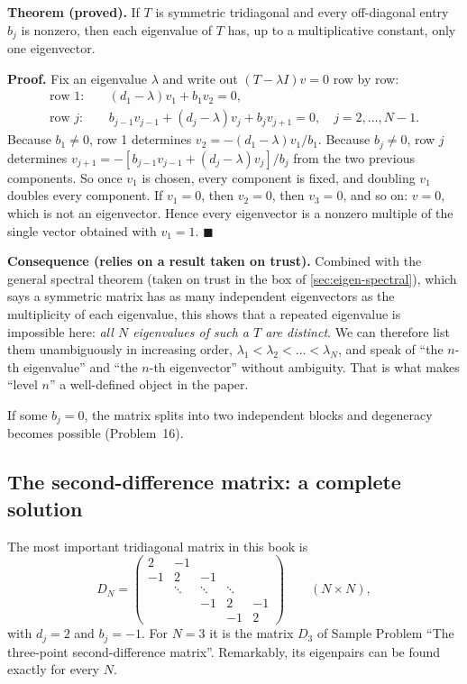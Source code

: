 \textbf{Theorem (proved).} If $T$ is symmetric tridiagonal and every off-diagonal entry $b_j$ is nonzero, then each eigenvalue of $T$ has, up to a multiplicative constant, only one eigenvector.

\textbf{Proof.} Fix an eigenvalue $\lambda$ and write out $(T-\lambda I)v=0$ row by row:
\begin{align}
\text{row }1:&\quad (d_1-\lambda)v_1+b_1v_2=0,\\
\text{row }j:&\quad b_{j-1}v_{j-1}+(d_j-\lambda)v_j+b_jv_{j+1}=0,\quad j=2,\dots,N-1.
\end{align}
Because $b_1\ne0$, row 1 determines $v_2=-(d_1-\lambda)v_1/b_1$. Because $b_j\ne0$, row $j$ determines $v_{j+1}=-[b_{j-1}v_{j-1}+(d_j-\lambda)v_j]/b_j$ from the two previous components. So once $v_1$ is chosen, every component is fixed, and doubling $v_1$ doubles every component. If $v_1=0$, then $v_2=0$, then $v_3=0$, and so on: $v=0$, which is not an eigenvector. Hence every eigenvector is a nonzero multiple of the single vector obtained with $v_1=1$. $\blacksquare$

\textbf{Consequence (relies on a result taken on trust).} Combined with the general spectral theorem (taken on trust in the box of \cref{sec:eigen-spectral}), which says a symmetric matrix has as many independent eigenvectors as the multiplicity of each eigenvalue, this shows that a repeated eigenvalue is impossible here: \emph{all $N$ eigenvalues of such a $T$ are distinct}. We can therefore list them unambiguously in increasing order, $\lambda_1<\lambda_2<\dots<\lambda_N$, and speak of ``the $n$-th eigenvalue'' and ``the $n$-th eigenvector'' without ambiguity. That is what makes ``level $n$'' a well-defined object in the paper.

If some $b_j=0$, the matrix splits into two independent blocks and degeneracy becomes possible (Problem~16).

\subsection{The second-difference matrix: a complete solution}

The most important tridiagonal matrix in this book is
\begin{equation}
D_N=\begin{pmatrix}
2&-1&&&\\
-1&2&-1&&\\
&\ddots&\ddots&\ddots&\\
&&-1&2&-1\\
&&&-1&2
\end{pmatrix}\qquad(N\times N),
\label{eq:eigen-DN}
\end{equation}
with $d_j=2$ and $b_j=-1$. For $N=3$ it is the matrix $D_3$ of Sample Problem ``The three-point second-difference matrix''. Remarkably, its eigenpairs can be found exactly for every $N$.

